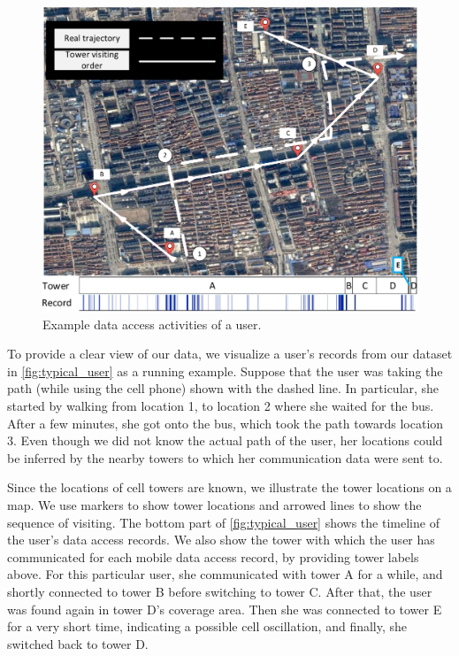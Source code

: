  \begin{figure}[h]
     \centering
     \includegraphics[width=0.8\linewidth]{./figures/typical_user.pdf}
     \caption{Example data access activities of a user.}
     \label{fig:typical_user}
     \vspace{-0.1in}
 \end{figure}

To provide a clear view of our data, we visualize a user's records from our dataset in \autoref{fig:typical_user} as a running example.
Suppose that the user was taking the path (while using the cell phone) shown with the dashed line.
In particular, she started by walking from location 1, to location 2 where she waited for the bus.
After a few minutes, she got onto the bus, which took the path towards location 3.
Even though we did not know the actual path of the user,
her locations could be inferred by the nearby towers to which her communication data were sent to.

Since the locations of cell towers are known, we illustrate the tower locations on a map.
We use markers to show tower locations and arrowed lines to show the sequence of visiting. The bottom part of \autoref{fig:typical_user} shows the timeline of the user's data access records. We also show the tower with which the user has communicated for each mobile data access record, by providing tower labels above.
For this particular user, she communicated with tower A for a while, 
and shortly connected to tower B before switching to tower C.
After that, the user was found again in tower D's coverage area.
Then she was connected to tower E for a very short time, indicating a possible cell oscillation, and finally, she switched back to tower D.



